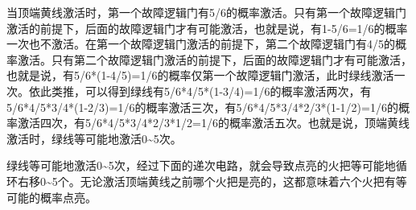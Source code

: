 \begin{figure}[!h]
\begin{center}
\end{center}
\caption{}
\label{i98:99}
\end{figure}

当顶端黄线激活时，第一个故障逻辑门有5/6的概率激活。只有第一个故障逻辑门激活的前提下，后面的故障逻辑门才有可能激活，也就是说，有1-5/6=1/6的概率一次也不激活。在第一个故障逻辑门激活的前提下，第二个故障逻辑门有4/5的概率激活。只有第二个故障逻辑门激活的前提下，后面的故障逻辑门才有可能激活，也就是说，有5/6*(1-4/5)=1/6的概率仅第一个故障逻辑门激活，此时绿线激活一次。依此类推，可以得到绿线有5/6*4/5*(1-3/4)=1/6的概率激活两次，有5/6*4/5*3/4*(1-2/3)=1/6的概率激活三次，有5/6*4/5*3/4*2/3*(1-1/2)=1/6的概率激活四次，有5/6*4/5*3/4*2/3*1/2=1/6的概率激活五次。也就是说，顶端黄线激活时，绿线等可能地激活0\~{}5次。

绿线等可能地激活0\~{}5次，经过下面的递次电路，就会导致点亮的火把等可能地循环右移0\~{}5个。无论激活顶端黄线之前哪个火把是亮的，这都意味着六个火把有等可能的概率点亮。

